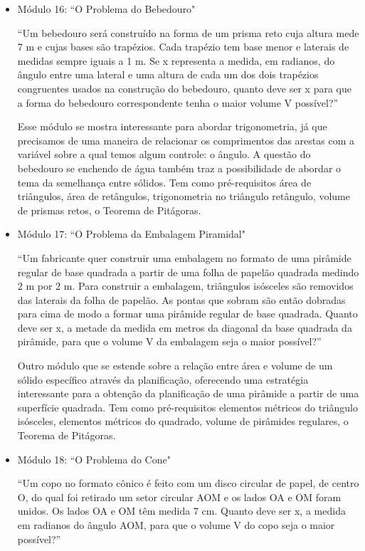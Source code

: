 \begin{itemize}
    \item Módulo 16: ``O Problema do Bebedouro"
    
    ``Um bebedouro será construído na forma de um prisma reto cuja altura mede 7 m e cujas bases são trapézios. Cada trapézio tem base menor e laterais de medidas sempre iguais a 1 m. Se x representa a medida, em radianos, do ângulo entre uma lateral e uma altura de cada um dos dois trapézios congruentes usados na construção do bebedouro, quanto deve ser x para que a forma do bebedouro correspondente tenha o maior volume V possível?”
    
    Esse módulo se mostra interessante para abordar trigonometria, já que precisamos de uma maneira de relacionar os comprimentos das arestas com a variável sobre a qual temos algum controle: o ângulo. A questão do bebedouro se enchendo de água também traz a possibilidade de abordar o tema da semelhança entre sólidos. Tem como pré-requisitos área de triângulos, área de retângulos, trigonometria no triângulo retângulo, volume de prismas retos, o Teorema de Pitágoras.
    
    \item Módulo 17: ``O Problema da Embalagem Piramidal"
    
    ``Um fabricante quer construir uma embalagem no formato de uma pirâmide regular de base quadrada a partir de uma folha de papelão quadrada medindo 2 m por 2 m. Para construir a embalagem, triângulos isósceles são removidos das laterais da folha de papelão. As pontas que sobram são então dobradas para cima de modo a formar uma pirâmide regular de base quadrada. Quanto deve ser x, a metade da medida em metros da diagonal da base quadrada da pirâmide, para que o volume V da embalagem seja o maior possível?”
    
    Outro módulo que se estende sobre a relação entre área e volume de um sólido específico através da planificação, oferecendo uma estratégia interessante para a obtenção da planificação de uma pirâmide a partir de uma superfície quadrada. Tem como pré-requisitos elementos métricos do triângulo isósceles, elementos métricos do quadrado, volume de pirâmides regulares, o Teorema de Pitágoras.
    
    \item Módulo 18: ``O Problema do Cone"
    
    ``Um copo no formato cônico é feito com um disco circular de papel, de centro O, do qual foi retirado um setor circular AOM e os lados OA e OM foram unidos. Os lados OA e OM têm medida 7 cm. Quanto deve ser x, a medida em radianos do ângulo AOM, para que o volume V do copo seja o maior possível?”
    

\end{itemize}
